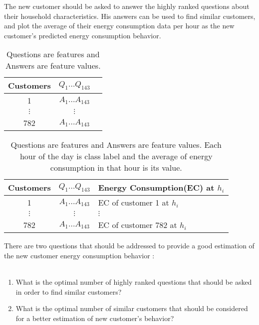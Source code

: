 \documentclass{sig-alternate-10pt}
\begin{document}
The new customer should be asked to answer the highly ranked questions about their household characteristics. His answers can be used to find similar customers, and plot the average of their energy consumption data per hour as the new customer's predicted energy consumption behavior.\\

\begin{table}
\centering
\caption{Questions are features and Answers are feature values.}
\begin{tabular}{|c|c|l|} \hline
Customers&$Q_1 \ldots Q_{143}$\\ \hline
1 & $A_1 \ldots A_{143}$\\ \hline
$\vdots$ & $\vdots$\\ \hline
782 & $A_1 \ldots A_{143}$ \\ \hline
\end{tabular}
\end{table}

\begin{table}
\centering
\caption{Questions are features and Answers are feature values. Each hour of the day is class label and the average of energy consumption in that hour is its value.}
\begin{tabular}{|c|c|l|} \hline
Customers&$Q_1 \ldots Q_{143}$&Energy Consumption(EC) at $h_i$\\ \hline
1 & $A_1 \ldots A_{143}$ &EC of customer 1 at $h_i$\\ \hline
$\vdots$ & $\vdots$& $\vdots$\\ \hline
782 & $A_1 \ldots A_{143}$ &EC of customer 782 at $h_i$\\ \hline
\end{tabular}
\end{table}


There are two questions that should be addressed to provide a good estimation of the new customer energy consumption behavior :\\ \\

\begin{enumerate}
  \item What is the optimal number of highly ranked questions that should be asked in order to find similar customers?
  \item What is the optimal number of similar customers that should be considered for a better estimation of new customer's behavior?
\end{enumerate}
 
\end{document}
